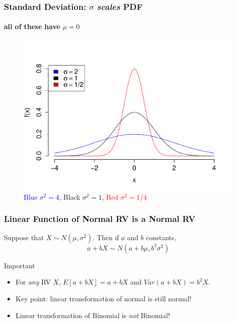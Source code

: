 \documentclass[handout]{beamer}
\begin{document}


\begin{frame}
  \frametitle{Standard Deviation: $\sigma$ \emph{scales} PDF}
\framesubtitle{all of these have $\mu=0$}

\begin{figure}
\includegraphics[scale = 0.5]{./images/normal_std_devs}
\caption{\textcolor{blue}{Blue $\sigma^2 = 4$},
Black $\sigma^2=1$,
\textcolor{red}{Red $\sigma^2= 1/4$}}
\end{figure}
\end{frame}



\begin{frame}
\frametitle{Linear Function of Normal RV is a Normal RV}


Suppose that $X \sim N(\mu, \sigma^2)$. Then if $a$ and $b$ constants,
$$\boxed{a + bX \sim N(a + b\mu, b^2 \sigma^2)}$$

\begin{block}{Important}
	\begin{itemize}
    \item  For \emph{any} RV $X$, $E[a + bX] = a +bX$ and $Var(a +bX) = b^2 X$.
		\item Key point: linear transformation of normal is still normal!
    \item Linear transformation of Binomial is \emph{not} Binomial!
	\end{itemize}
\end{block}

\end{frame}
\end{document}
